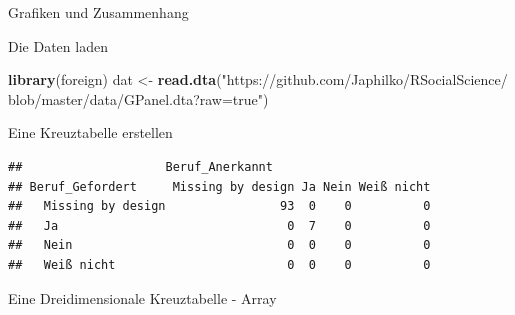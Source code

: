 \documentclass[ignorenonframetext,]{beamer}
\newenvironment{Shaded}{}{}
\newcommand{\KeywordTok}[1]{\textcolor[rgb]{0.00,0.44,0.13}{\textbf{{#1}}}}
\newcommand{\StringTok}[1]{\textcolor[rgb]{0.25,0.44,0.63}{{#1}}}
\newcommand{\NormalTok}[1]{{#1}}
\begin{document}
\begin{frame}[fragile]{Grafiken und Zusammenhang}

\begin{block}{Die Daten laden}

\begin{Shaded}
\begin{Highlighting}[]
\KeywordTok{library}\NormalTok{(foreign)}
\NormalTok{dat <-}\StringTok{ }\KeywordTok{read.dta}\NormalTok{(}\StringTok{"https://github.com/Japhilko/RSocialScience/}
\StringTok{      blob/master/data/GPanel.dta?raw=true"}\NormalTok{)}
\end{Highlighting}
\end{Shaded}

\end{block}

\begin{block}{Eine Kreuztabelle erstellen}

\begin{Shaded}
\end{Shaded}

\begin{verbatim}
##                    Beruf_Anerkannt
## Beruf_Gefordert     Missing by design Ja Nein Weiß nicht
##   Missing by design                93  0    0          0
##   Ja                                0  7    0          0
##   Nein                              0  0    0          0
##   Weiß nicht                        0  0    0          0
\end{verbatim}

\end{block}

\begin{block}{Eine Dreidimensionale Kreuztabelle - Array}

\begin{Shaded}
\end{Shaded}


\end{block}
\end{frame}
\end{document}
